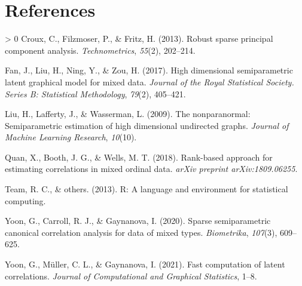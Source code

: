 \documentclass[10pt,a4paper,onecolumn]{article}
\newlength{\cslhangindent}
\newenvironment{CSLReferences}[3] %
 {%
  \setlength{\parindent}{0pt}
  \ifodd #1 \everypar{\setlength{\hangindent}{\cslhangindent}}\ignorespaces\fi
  \ifnum #2 > 0
  \setlength{\parskip}{#2\baselineskip}
  \fi
 }%
 {}
\begin{document}
\hypertarget{references}{%
\section*{References}\label{references}}

\hypertarget{refs}{}
\begin{CSLReferences}{1}{0}
\leavevmode\hypertarget{ref-croux2013robust}{}%
Croux, C., Filzmoser, P., \& Fritz, H. (2013). Robust sparse principal
component analysis. \emph{Technometrics}, \emph{55}(2), 202--214.

\leavevmode\hypertarget{ref-fan2017high}{}%
Fan, J., Liu, H., Ning, Y., \& Zou, H. (2017). High dimensional
semiparametric latent graphical model for mixed data. \emph{Journal of
the Royal Statistical Society. Series B: Statistical Methodology},
\emph{79}(2), 405--421.

\leavevmode\hypertarget{ref-liu2009nonparanormal}{}%
Liu, H., Lafferty, J., \& Wasserman, L. (2009). The nonparanormal:
Semiparametric estimation of high dimensional undirected graphs.
\emph{Journal of Machine Learning Research}, \emph{10}(10).

\leavevmode\hypertarget{ref-quan2018rank}{}%
Quan, X., Booth, J. G., \& Wells, M. T. (2018). Rank-based approach for
estimating correlations in mixed ordinal data. \emph{arXiv preprint
arXiv:1809.06255}.

\leavevmode\hypertarget{ref-team2013r}{}%
Team, R. C., \& others. (2013). R: A language and environment for
statistical computing.

\leavevmode\hypertarget{ref-yoon2020sparse}{}%
Yoon, G., Carroll, R. J., \& Gaynanova, I. (2020). Sparse semiparametric
canonical correlation analysis for data of mixed types.
\emph{Biometrika}, \emph{107}(3), 609--625.

\leavevmode\hypertarget{ref-yoon2021fast}{}%
Yoon, G., Müller, C. L., \& Gaynanova, I. (2021). Fast computation of
latent correlations. \emph{Journal of Computational and Graphical
Statistics}, 1--8.

\end{CSLReferences}
\end{document}
